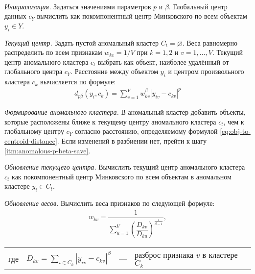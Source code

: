 \documentclass[12pt]{a&t}
\begin{document}
\begin{algorithm} \label{alg:anomalous-p-beta}
	\
	\begin{enumlist}[.] 
		
		\item \textit{Инициализация.} Задаться значениями параметров $ p $ и $ \beta $. Глобальный центр данных $ c_Y $ вычислить как покомпонентный центр Минковского по всем объектам \mbox{$ y_i \in Y $.}
		
		\item \label{itm:anomalous-p-beta-tent-centroid} \textit{Текущий центр.} Задать пустой аномальный кластер $ C_t = \varnothing $. Веса равномерно распределить по всем признакам $ w_{kv} = 1/V $ при $ k=1,2 $ и $ v=1,\ldots,V $. Текущий центр аномального кластера $ c_t $ выбрать как объект, наиболее удалённый от глобального центра $ c_Y $. Расстояние между объектом $ y_i $ и центром произвольного кластера $ c_k $ вычисляется по формуле:
		\begin{gather} \label{eq:obj-to-centroid-distance}
			d_{p\beta}(y_i,c_k)=\sum_{v=1}^{V}w^\beta_{kv}|y_{iv}-c_{kv}|^p
		\end{gather}
		
		\item \textit{Формирование аномального кластера.} В аномальный кластер добавить объекты, которые расположены ближе к текущему центру аномального кластера $ c_t $, чем к глобальному центру $ c_Y $ согласно расстоянию, определяемому формулой \ref{eq:obj-to-centroid-distance}. Если изменений в разбиении нет, прейти к шагу \ref{itm:anomalous-p-beta-save}.
		
		\item \textit{Обновление текущего центра.} Вычислить текущий центр аномального кластера $ c_t $ как покомпонентный центр Минковского по всем объектам в аномальном кластере $ y_i \in C_t $.
		
		\item \textit{Обновление весов.} Вычислить веса признаков по следующей формуле:
		\begin{gather} \label{eq:weights}
			w_{kv}=\dfrac{1}{\sum_{u=1}^{V} \left ( \dfrac{D_{kv}}{D_{ku}} \right )^{\frac{1}{\beta-1}}},
		\end{gather}
		\begin{tabular}{llll}
			где & $D_{kv}=\sum_{i\in C_k}^{}|y_{iv}-c_{kv}|^\beta$ & {---} & разброс признака $ v $ в кластере $ C_k $ \\
		\end{tabular}
		

\end{enumlist}
\end{algorithm}
\end{document}
